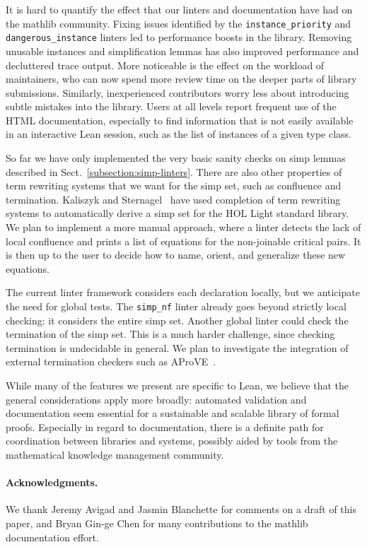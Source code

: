 \documentclass[runningheads]{llncs}
\newcommand{\mathlib}{\textsf{mathlib}\xspace}
\newcommand{\lean}[1]{\lstinline[language=lean]{#1}}
\begin{document}
It is hard to quantify the effect
that our linters and documentation have had on the \mathlib community.
Fixing issues identified by
the \lean{instance_priority} and \lean{dangerous_instance} linters
led to performance boosts in the library.
Removing unusable instances and simplification lemmas
has also improved performance and decluttered trace output.
More noticeable is the effect on the workload of maintainers,
who can now spend more review time on the deeper parts of library submissions.
Similarly, inexperienced contributors worry less about
introducing subtle mistakes into the library.
Users at all levels report frequent use of the HTML documentation,
especially to find information that is not easily available in an interactive Lean session,
such as the list of instances of a given type class.

So far we have only implemented
the very basic sanity checks on simp lemmas
described in Sect.~\ref{subsection:simp-linters}.
There are also other properties of term rewriting systems
that we want for the simp set,
such as confluence and termination.
Kaliszyk and Sternagel~\cite{KaliszykS13} have used
completion of term rewriting systems
to automatically derive a simp set
for the HOL Light standard library.
We plan to implement a more manual approach,
where a linter detects the lack of local confluence
and prints a list of equations for
the non-joinable critical pairs.
It is then up to the user to decide how to name, orient,
and generalize these new equations.

The current linter framework considers each declaration locally,
but we anticipate the need for global tests.
The \lean{simp_nf} linter
already goes beyond strictly local checking:
it considers the entire simp set.
Another global linter could
check the termination of the simp set.
This is a much harder challenge,
since checking termination is undecidable in general.
We plan to investigate the integration
of external termination checkers
such as AProVE~\cite{Giesl2017}. %

While many of the features we present are specific to Lean,
we believe that the general considerations apply more broadly:
automated validation and documentation seem essential
for a sustainable and scalable library of formal proofs.
Especially in regard to documentation,
there is a definite path for coordination between libraries and systems,
possibly aided by tools from the mathematical knowledge management community.

\paragraph{Acknowledgments.}
We thank Jeremy Avigad and Jasmin Blanchette for comments on a draft of this paper,
and Bryan Gin-ge Chen for many contributions to the \mathlib documentation effort.


%
%
%
 
 
\end{document}
